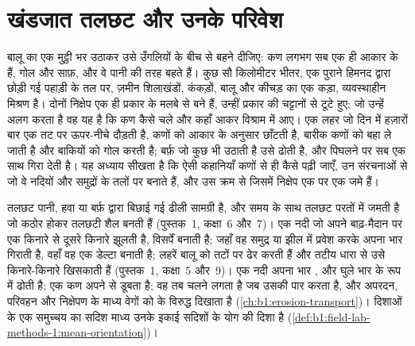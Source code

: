\chapter{खंडजात तलछट और उनके परिवेश}\label{ch:b1:clastic-sediments}

बालू का एक मुट्ठी भर उठाकर उसे उँगलियों के बीच से बहने दीजिए: कण लगभग सब एक ही आकार के हैं, गोल और साफ़, और वे पानी की तरह बहते हैं। कुछ सौ किलोमीटर भीतर, एक पुराने हिमनद द्वारा छोड़ी गई पहाड़ी के तल पर, ज़मीन शिलाखंडों, कंकड़ों, बालू और कीचड़ का एक कड़ा, व्यवस्थाहीन मिश्रण है। दोनों निक्षेप एक ही प्रकार के मलबे से बने हैं, उन्हीं प्रकार की चट्टानों से टूटे हुए; जो उन्हें अलग करता है वह यह है कि कण कैसे चले और कहाँ आकर विश्राम में आए। एक लहर जो दिन में हज़ारों बार एक तट पर ऊपर-नीचे दौड़ती है, कणों को आकार के अनुसार छाँटती है, बारीक कणों को बहा ले जाती है और बाकियों को गोल करती है; बर्फ़ जो कुछ भी उठाती है उसे ढोती है, और पिघलने पर सब एक साथ गिरा देती है। यह अध्याय सीखता है कि ऐसी कहानियाँ कणों से ही कैसे पढ़ी जाएँ, उन संरचनाओं से जो वे नदियों और समुद्रों के तलों पर बनाते हैं, और उस क्रम से जिसमें निक्षेप एक पर एक जमे हैं।

\begin{recall}
तलछट पानी, हवा या बर्फ़ द्वारा बिछाई गई ढीली सामग्री है, और समय के साथ तलछट परतों में जमती है जो कठोर होकर तलछटी शैल बनती हैं (पुस्तक~1, कक्षा~6 और~7)। एक नदी जो अपने बाढ़-मैदान पर एक किनारे से दूसरे किनारे झूलती है, विसर्पें बनाती है; जहाँ वह समुद्र या झील में प्रवेश करके अपना भार गिराती है, वहाँ वह एक डेल्टा बनाती है; लहरें बालू को तटों पर ढेर करती हैं और तटीय धारा से उसे किनारे-किनारे खिसकाती हैं (पुस्तक~1, कक्षा~5 और~9)। एक नदी अपना भार ,  और घुले भार के रूप में ढोती है; एक कण अपने  से डूबता है; वह तब चलने लगता है जब  उसकी  पार करता है, और  अपरदन, परिवहन और निक्षेपण के माध्य वेगों को  के विरुद्ध दिखाता है (\cref{ch:b1:erosion-transport})। दिशाओं के एक समुच्चय का सदिश माध्य उनके इकाई सदिशों के योग की दिशा है (\cref{def:b1:field-lab-methods-1:mean-orientation})।
\end{recall}

